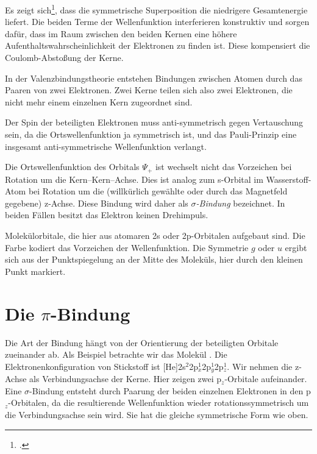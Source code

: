 Es zeigt sich\footcite[Kapitel 4.4.2]{Haken_wolf_II}, dass die symmetrische Superposition die niedrigere Gesamtenergie liefert. Die beiden Terme der Wellenfunktion interferieren konstruktiv und sorgen dafür, dass im Raum zwischen den beiden Kernen eine höhere Aufenthaltswahrscheinlichkeit der Elektronen zu finden ist. Diese kompensiert die Coulomb-Abstoßung der Kerne.

In der Valenzbindungstheorie entstehen Bindungen zwischen Atomen durch das 
Paaren von zwei Elektronen. Zwei Kerne teilen sich also zwei Elektronen, die nicht mehr einem einzelnen Kern zugeordnet sind.

Der Spin der beteiligten Elektronen muss anti-symmetrisch gegen Vertauschung sein, da die Ortswellenfunktion ja symmetrisch ist, und das Pauli-Prinzip eine insgesamt anti-symmetrische Wellenfunktion  verlangt.

Die Ortswellenfunktion des Orbitals $\Psi_{+}$ ist wechselt nicht das Vorzeichen bei Rotation um die Kern--Kern--Achse. Dies ist analog zum s-Orbital im Wasserstoff-Atom bei Rotation um die (willkürlich gewählte oder durch das Magnetfeld gegebene) z-Achse.  Diese Bindung wird daher als \emph{$\sigma$-Bindung} bezeichnet. In beiden Fällen besitzt das Elektron keinen Drehimpuls.


\begin{marginfigure}
\caption{Molekülorbitale, die hier aus atomaren 2s oder 2p-Orbitalen aufgebaut sind. Die Farbe kodiert das Vorzeichen der Wellenfunktion. Die Symmetrie $g$ oder $u$ ergibt sich aus der Punktspiegelung an der Mitte des Moleküls, hier durch den kleinen Punkt markiert.}
\end{marginfigure}



\section{Die $\pi$-Bindung}

Die Art der Bindung hängt von der Orientierung der beteiligten Orbitale zueinander ab. Als Beispiel betrachte wir das Molekül . Die Elektronenkonfiguration von Stickstoff ist [He]2s$^2$2p$_x^1$2p$_y^1$2p$_z^1$. Wir nehmen die z-Achse als Verbindungsachse der Kerne. Hier zeigen zwei p$_z$-Orbitale aufeinander. Eine $\sigma$-Bindung entsteht durch Paarung der beiden einzelnen Elektronen in den  p$_z$-Orbitalen, da die resultierende Wellenfunktion wieder rotationssymmetrisch um die Verbindungsachse sein wird. Sie hat die gleiche symmetrische Form wie oben.

